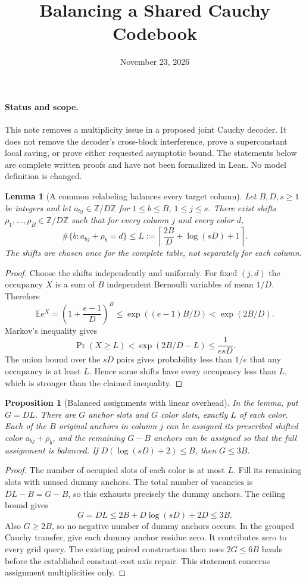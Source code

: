 \documentclass[11pt]{article}
\title{Balancing a Shared Cauchy Codebook}
\author{}
\date{November 23, 2026}
\newtheorem{lemma}{Lemma}
\newtheorem{proposition}{Proposition}
\begin{document}
\maketitle

\paragraph{Status and scope.}
This note removes a multiplicity issue in a proposed joint Cauchy decoder.
It does not remove the decoder's cross-block interference, prove a
superconstant local saving, or prove either requested asymptotic bound.
The statements below are complete written proofs and have not been
formalized in Lean. No model definition is changed.

\begin{lemma}[A common relabeling balances every target column]
Let $B,D,s\geq1$ be integers and let
$a_{bj}\in\mathbb Z/D\mathbb Z$ for $1\leq b\leq B$, $1\leq j\leq s$.
There exist shifts $\rho_1,\ldots,\rho_B\in\mathbb Z/D\mathbb Z$ such that
for every column $j$ and every color $d$,
\[
 \#\{b:a_{bj}+\rho_b=d\}\leq
 L:=\left\lceil\frac{2B}{D}+\log(sD)+1\right\rceil.
\]
The shifts are chosen once for the complete table, not separately for
each column.
\end{lemma}
\begin{proof}
Choose the shifts independently and uniformly. For fixed $(j,d)$ the
occupancy $X$ is a sum of $B$ independent Bernoulli variables of mean
$1/D$. Therefore
\[
 \mathbb E e^X=\left(1+\frac{e-1}{D}\right)^B
 \leq \exp\left((e-1)B/D\right)<\exp(2B/D).
\]
Markov's inequality gives
\[
 \Pr(X\geq L)<\exp(2B/D-L)\leq\frac1{e sD}.
\]
The union bound over the $sD$ pairs gives probability less than $1/e$
that any occupancy is at least $L$. Hence some shifts have every
occupancy less than $L$, which is stronger than the claimed inequality.
\end{proof}

\begin{proposition}[Balanced assignments with linear overhead]
In the lemma, put $G=DL$. There are $G$ anchor slots and $G$ color slots,
exactly $L$ of each color. Each of the $B$ original anchors in column $j$
can be assigned its prescribed shifted color $a_{bj}+\rho_b$, and the
remaining $G-B$ anchors can be assigned so that the full assignment is
balanced. If $D(\log(sD)+2)\leq B$, then $G\leq3B$.
\end{proposition}
\begin{proof}
The number of occupied slots of each color is at most $L$. Fill its
remaining slots with unused dummy anchors. The total number of vacancies
is $DL-B=G-B$, so this exhausts precisely the dummy anchors. The ceiling
bound gives
\[
 G=DL\leq 2B+D\log(sD)+2D\leq3B.
\]
Also $G\geq2B$, so no negative number of dummy anchors occurs.
In the grouped Cauchy transfer, give each dummy anchor residue zero.
It contributes zero to every grid query. The existing paired construction
then uses $2G\leq6B$ heads before the established constant-cost axis
repair. This statement concerns assignment multiplicities only.
\end{proof}
\end{document}
